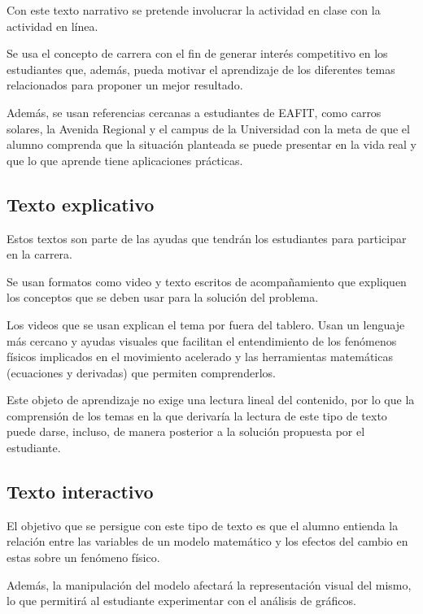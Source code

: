 \documentclass[twoside,letterpaper,11pt]{report}
\begin{document}
Con este texto narrativo se pretende involucrar la actividad en clase con la actividad en línea. 

Se usa el concepto de carrera con el fin de generar interés competitivo en los estudiantes que, además, pueda motivar el aprendizaje de los diferentes temas relacionados para proponer un mejor resultado.

Además, se usan referencias cercanas a estudiantes de EAFIT, como carros solares, la Avenida Regional y el campus de la Universidad con la meta de que el alumno comprenda que la situación planteada se puede presentar en la vida real y que lo que aprende tiene aplicaciones prácticas.


\subsection{Texto explicativo} %
\label{sub:texto_explicativo}

Estos textos son parte de las ayudas que tendrán los estudiantes para participar en la carrera.

Se usan formatos como video y texto escritos de acompañamiento que expliquen los conceptos que se deben usar para la solución del problema.

Los videos que se usan explican el tema por fuera del tablero. Usan un lenguaje más cercano y ayudas visuales que facilitan el entendimiento de los fenómenos físicos implicados en el movimiento acelerado y las herramientas matemáticas (ecuaciones y derivadas) que permiten comprenderlos.

Este objeto de aprendizaje no exige una lectura lineal del contenido, por lo que la comprensión de los temas en la que derivaría la lectura de este tipo de texto puede darse, incluso, de manera posterior a la solución propuesta por el estudiante.


\subsection{Texto interactivo} %
\label{sub:texto_interactivo}

El objetivo que se persigue con este tipo de texto es que el alumno entienda la relación entre las variables de un modelo matemático y los efectos del cambio en estas sobre un fenómeno físico.

Además, la manipulación del modelo afectará la representación visual del mismo, lo que permitirá al estudiante experimentar con el análisis de gráficos.
\end{document}

